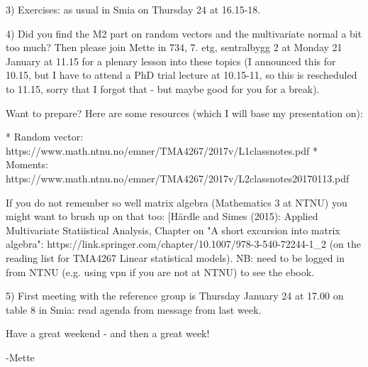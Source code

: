 3) Exercises: as usual in Smia on Thursday 24 at 16.15-18.

4) Did you find the M2 part on random vectors and the multivariate normal a bit too much? Then please join Mette in 734, 7. etg, sentralbygg 2 at Monday 21 January at 11.15 for a plenary lesson into these topics (I announced this for 10.15, but I have to attend a PhD trial lecture at 10.15-11, so this is rescheduled to 11.15, sorry that I forgot that - but maybe good for you for a break). 

Want to prepare? Here are some resources (which I will base my presentation on):

* Random vector: https://www.math.ntnu.no/emner/TMA4267/2017v/L1classnotes.pdf
* Moments: https://www.math.ntnu.no/emner/TMA4267/2017v/L2classnotes20170113.pdf

If you do not remember so well matrix algebra (Mathematics 3 at NTNU) you might want to brush up on that too:
[Härdle and Simes (2015): Applied Multivariate Statiistical Analysis, Chapter on "A short excursion into matrix algebra": https://link.springer.com/chapter/10.1007/978-3-540-72244-1_2 (on the reading list for TMA4267 Linear statistical models). NB: need to be logged in from NTNU (e.g. using vpn if you are not at NTNU) to see the ebook.

5) First meeting with the reference group is Thursday January 24 at 17.00 on table 8 in Smia: read agenda from message from last week. 

Have a great weekend - and then a great week!

-Mette
